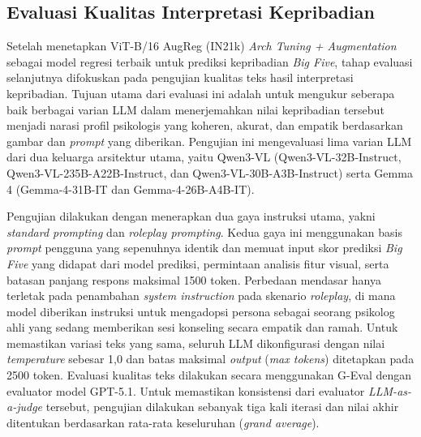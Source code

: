 \subsection{Evaluasi Kualitas Interpretasi Kepribadian}

Setelah menetapkan ViT-B/16 AugReg (IN21k) \textit{Arch Tuning + Augmentation} sebagai model regresi terbaik untuk prediksi kepribadian \textit{Big Five}, tahap evaluasi selanjutnya difokuskan pada pengujian kualitas teks hasil interpretasi kepribadian. Tujuan utama dari evaluasi ini adalah untuk mengukur seberapa baik berbagai varian LLM dalam menerjemahkan nilai kepribadian tersebut menjadi narasi profil psikologis yang koheren, akurat, dan empatik berdasarkan gambar dan \textit{prompt} yang diberikan. Pengujian ini mengevaluasi lima varian LLM dari dua keluarga arsitektur utama, yaitu Qwen3-VL (Qwen3-VL-32B-Instruct, Qwen3-VL-235B-A22B-Instruct, dan Qwen3-VL-30B-A3B-Instruct) serta Gemma 4 (Gemma-4-31B-IT dan Gemma-4-26B-A4B-IT). 

Pengujian dilakukan dengan menerapkan dua gaya instruksi utama, yakni \textit{standard prompting} dan \textit{roleplay prompting}. Kedua gaya ini menggunakan basis \textit{prompt} pengguna yang sepenuhnya identik dan memuat input skor prediksi \textit{Big Five} yang didapat dari model prediksi, permintaan analisis fitur visual, serta batasan panjang respons maksimal 1500 token. Perbedaan mendasar hanya terletak pada penambahan \textit{system instruction} pada skenario \textit{roleplay}, di mana model diberikan instruksi untuk mengadopsi persona sebagai seorang psikolog ahli yang sedang memberikan sesi konseling secara empatik dan ramah. Untuk memastikan variasi teks yang sama, seluruh LLM dikonfigurasi dengan nilai \textit{temperature} sebesar 1,0 dan batas maksimal \textit{output} (\textit{max tokens}) ditetapkan pada 2500 token. Evaluasi kualitas teks dilakukan secara menggunakan G-Eval dengan evaluator model GPT-5.1. Untuk memastikan konsistensi dari evaluator \textit{LLM-as-a-judge} tersebut, pengujian dilakukan sebanyak tiga kali iterasi dan nilai akhir ditentukan berdasarkan rata-rata keseluruhan (\textit{grand average}).

